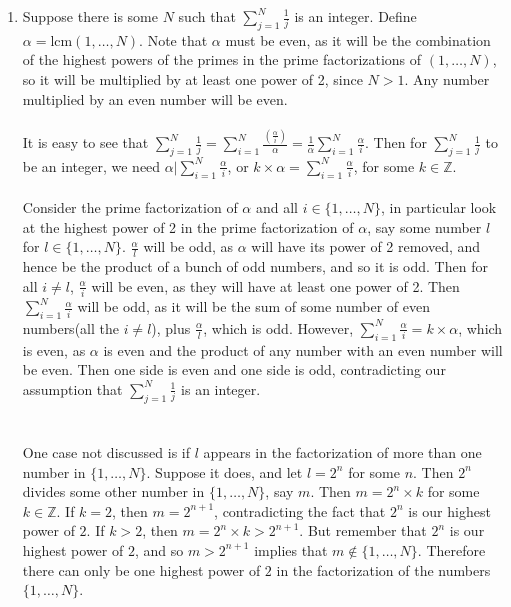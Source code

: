 \documentclass[10pt,english]{article}
\begin{document}
\begin{enumerate}
\pagebreak
\item Suppose there is some $N$ such that $\sum_{j=1}^N\frac{1}{j}$ is an integer. Define $\alpha=\text{lcm}(1,\ldots,N)$. Note that $\alpha$ must be even, as it will be the combination of the highest powers of the primes in the prime factorizations of $(1,\ldots,N)$, so it will be multiplied by at least one power of 2, since $N>1$. Any number multiplied by an even number will be even. \\ \\
It is easy to see that $\sum_{j=1}^N\frac{1}{j}=\sum_{i=1}^N\frac{\left(\frac{\alpha}{i}\right)}{\alpha}=\frac{1}{\alpha}\sum_{i=1}^N\frac{\alpha}{i}$. Then for $\sum_{j=1}^N\frac{1}{j}$ to be an integer, we need $\alpha|\sum_{i=1}^N\frac{\alpha}{i}$, or $k\times\alpha=\sum_{i=1}^N\frac{\alpha}{i}$, for some $k\in\mathbb{Z}$.  \\ \\
Consider the prime factorization of $\alpha$ and all $i\in\{1,\ldots,N\}$, in particular look at the highest power of 2 in the prime factorization of $\alpha$, say some number $l$ for $l\in\{1,\ldots,N\}$. $\frac{\alpha}{l}$ will be odd, as $\alpha$ will have its power of 2 removed, and hence be the product of a bunch of odd numbers, and so it is odd. Then for all $i\neq l$, $\frac{\alpha}{i}$ will be even, as they will have at least one power of 2. Then $\sum_{i=1}^N\frac{\alpha}{i}$ will be odd, as it will be the sum of some number of even numbers(all the $i\neq l$), plus $\frac{\alpha}{l}$, which is odd. However, $\sum_{i=1}^N\frac{\alpha}{i}=k\times\alpha$, which is even, as $\alpha$ is even and the product of any number with an even number will be even. Then one side is even and one side is odd, contradicting our assumption that $\sum_{j=1}^N\frac{1}{j}$ is an integer. \\ \\ \\ 

One case not discussed is if $l$ appears in the factorization of more than one number in $\{1,\ldots,N\}$. Suppose it does, and let $l=2^n$ for some $n$. Then $2^n$ divides some other number in $\{1,\ldots,N\}$, say $m$. Then $m=2^n\times k$ for some $k\in\mathbb{Z}$. If $k=2$, then $m=2^{n+1}$, contradicting the fact that $2^n$ is our highest power of $2$. If $k>2$, then $m=2^n\times k > 2^{n+1}$. But remember that $2^n$ is our highest power of $2$, and so $m>2^{n+1}$ implies that $m\notin\{1,\ldots,N\}$. Therefore there can only be one highest power of $2$ in the factorization of the numbers $\{1,\ldots,N\}$.



\end{enumerate}
\end{document}
